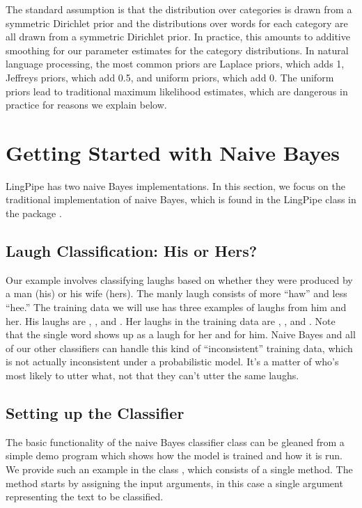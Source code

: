 The standard assumption is that the distribution over categories is
drawn from a symmetric Dirichlet prior and the distributions over
words for each category are all drawn from a symmetric Dirichlet
prior.  In practice, this amounts to additive smoothing for our
parameter estimates for the category distributions.  In natural
language processing, the most common priors are Laplace priors, which
adds 1, Jeffreys priors, which add 0.5, and uniform priors, which add
0.  The uniform priors lead to traditional maximum likelihood
estimates, which are dangerous in practice for reasons we explain
below.


\section{Getting Started with Naive Bayes}\label{section:nb-getting-started}

LingPipe has two naive Bayes implementations.  In this section, we
focus on the traditional implementation of naive Bayes, which is found
in the LingPipe class  in the package
.  

\subsection{Laugh Classification: His or Hers?}

Our example involves classifying laughs based on whether they were
produced by a man (his) or his wife (hers).  The manly laugh consists
of more ``haw'' and less ``hee.''  The training data we will use has
three examples of laughs from him and her.  His laughs are
, , and
.  Her laughs in the training data are
, , and
.  Note that the single word 
shows up as a laugh for her and for him.  Naive Bayes and all of our
other classifiers can handle this kind of ``inconsistent'' training
data, which is not actually inconsistent under a probabilistic model.
It's a matter of who's most likely to utter what, not that they
can't utter the same laughs.

\subsection{Setting up the Classifier}

The basic functionality of the naive Bayes classifier class can be
gleaned from a simple demo program which shows how the model is
trained and how it is run.  We provide such an example in the class
, which consists of a single  method.
The method starts by assigning the input arguments, in this case
a single argument representing the text to be classified.
%

